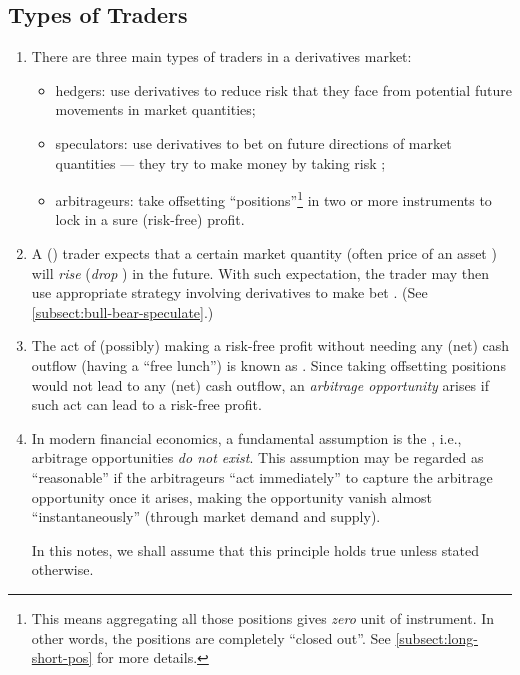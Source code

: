 \subsection{Types of Traders}
\begin{enumerate}
\item There are three main types of traders in a derivatives market:
\begin{itemize}
\item hedgers: use derivatives to reduce risk  that they face
from potential future movements  in market quantities;
\item speculators: use derivatives to bet  on future directions
of market quantities  --- they try to make money
 by taking risk ;
\item arbitrageurs: take offsetting ``positions''\footnote{This means
aggregating all those positions gives \emph{zero} unit of instrument. In other
words, the positions are completely ``closed out''. See
\cref{subsect:long-short-pos} for more details.} in two or more instruments to
lock in  a sure (risk-free) profit.
\end{itemize}

\item A  () trader expects that a certain market
quantity (often price of an asset ) will \emph{rise}
{\color{ForestGreen}} (\emph{drop}
{\color{red}}) in the future. With such expectation, the
trader may then use appropriate strategy involving derivatives to make bet
. (See \cref{subsect:bull-bear-speculate}.)

\item The act of (possibly) making a risk-free profit without needing any (net) cash
outflow (having a ``free lunch'') is known as . Since taking
offsetting positions would not lead to any (net) cash outflow, an
\emph{arbitrage opportunity} arises if such act can lead to a risk-free profit.

\item \label{it:no-arbitrage-principle}
In modern financial economics, a fundamental assumption is the
, i.e., arbitrage opportunities \emph{do not
exist}. This assumption may be regarded as ``reasonable'' if the arbitrageurs
``act immediately'' to capture the arbitrage opportunity once it arises, making the
opportunity vanish almost ``instantaneously'' (through market demand and supply).

In this notes, we shall assume that this principle holds true unless stated
otherwise.
\end{enumerate}


